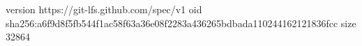 version https://git-lfs.github.com/spec/v1
oid sha256:a6f9d8f5fb544f1ac58f63a36e08f2283a436265bdbada110244162121836fcc
size 32864
